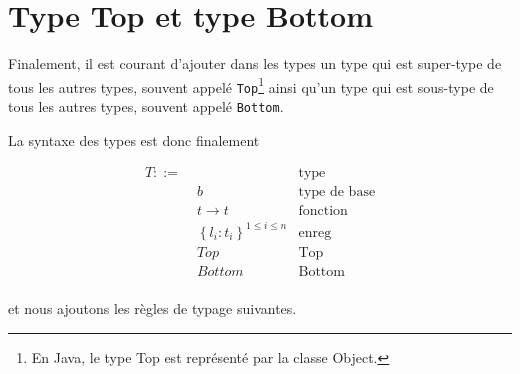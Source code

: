 \section{Type Top et type Bottom}

Finalement, il
est courant d'ajouter dans les types un type qui est super-type de tous les
autres types, souvent appelé \verb|Top|\footnote{En Java, le type Top
  est représenté par la classe Object.} ainsi qu'un type qui est sous-type de
tous les autres types, souvent appelé \verb|Bottom|.

La syntaxe des types est donc finalement

\begin{align*}
  T ::= & \, & \text{type} \\
        & \; b & \text{type de base} \\
        & \; t \rightarrow t & \text{fonction} \\
        & \; \left\{ l_{i} : t_{i} \right\}^{1 \leq i \leq n} & \text{enreg} \\
        & \; Top & \text{Top} \\
        & \; Bottom & \text{Bottom} \\
\end{align*}

et nous ajoutons les règles de typage suivantes.


